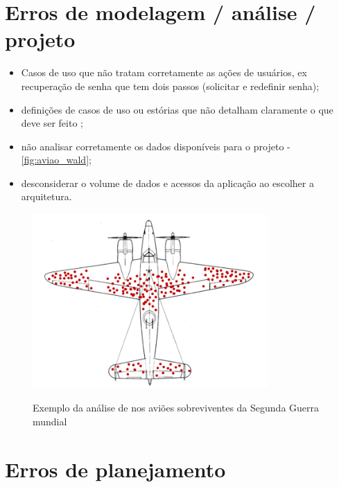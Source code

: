 \section{Erros de modelagem / análise / projeto}

\begin{itemize}
    \item Casos de uso que não tratam corretamente as ações de usuários, ex recuperação de senha que tem dois passos (solicitar e redefinir senha);
    
    \item definições de casos de uso ou estórias que não detalham claramente o que deve ser feito 
    \newline
    ;
    
    \item não analisar corretamente os dados disponíveis para o projeto \cite{boas_perguntas_dados} \cite{guerra-matematica} \cite{ellenberg2015poder} -  \autoref{fig:aviao_wald};
    
    \item desconsiderar o volume de dados e acessos da aplicação ao escolher a arquitetura.
\end{itemize}

\begin{figure}
    \centering
    \caption{Exemplo da análise de  nos aviões sobreviventes da Segunda Guerra mundial}
	\includegraphics[width=0.8\textwidth]{erros/aviao_wald.png}
    \label{fig:aviao_wald}
\end{figure}


\section{Erros de planejamento}

